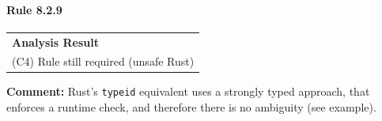 \paragraph{Rule 8.2.9}
\begin{longtable}{p{13cm}}
\textbf{Analysis Result} \\
(C4) Rule still required (unsafe Rust) \\
\end{longtable}
\textbf{Comment:} Rust's \texttt{typeid} equivalent uses a strongly typed approach, that enforces a runtime check, and therefore there is no ambiguity (see example). \\


